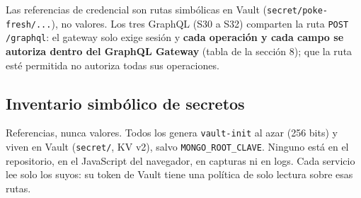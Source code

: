 \begin{landscape}
Las referencias de credencial son rutas simbólicas en Vault (\texttt{secret/\allowbreak{}poke-\allowbreak{}fresh/\allowbreak{}.\allowbreak{}.\allowbreak{}.\allowbreak{}}), no valores. Los tres GraphQL (S30 a S32) comparten la ruta \texttt{POST /\allowbreak{}graphql}: el gateway solo exige sesión y \textbf{cada operación y cada campo se autoriza dentro del GraphQL Gateway} (tabla de la sección 8); que la ruta esté permitida no autoriza todas sus operaciones.

\subsection{Inventario simbólico de secretos}
Referencias, nunca valores. Todos los genera \texttt{vault-\allowbreak{}init} al azar (256 bits) y viven en Vault (\texttt{secret/\allowbreak{}}, KV v2), salvo \texttt{MONGO\_\allowbreak{}ROOT\_\allowbreak{}CLAVE}. Ninguno está en el repositorio, en el JavaScript del navegador, en capturas ni en logs. Cada servicio lee solo los suyos: su token de Vault tiene una política de solo lectura sobre esas rutas.


\end{landscape}
